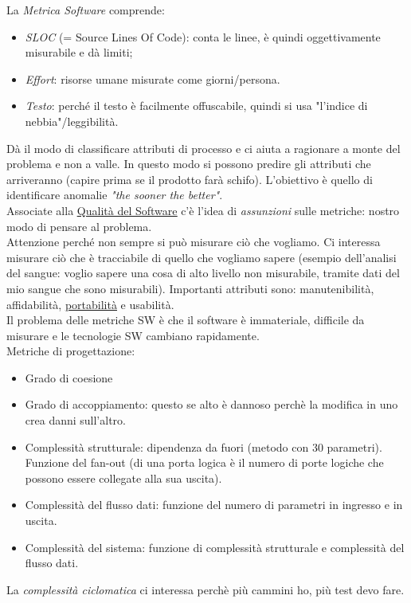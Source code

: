 		La \textit{Metrica Software} comprende:
			\begin{itemize}
				\item \textit{SLOC} (= Source Lines Of Code): conta le linee, è quindi oggettivamente misurabile e dà limiti;
				\item \textit{Effort}: risorse umane misurate come giorni/persona.
				\item \textit{Testo}: perché il testo è facilmente offuscabile, quindi si usa "l'indice di nebbia"/leggibilità. 
			\end{itemize}
		Dà il modo di classificare attributi di processo e ci aiuta a ragionare a monte del problema e non a valle. In questo modo si possono predire gli attributi che arriveranno (capire prima se il prodotto farà schifo). L'obiettivo è quello di identificare anomalie \textit{"the sooner the better"}. \\
		Associate alla \underline{\hyperref[qualita]{Qualità del Software}} c'è l'idea di \textit{assunzioni} sulle metriche: nostro modo di pensare al problema. \\
		Attenzione perché non sempre si può misurare ciò che vogliamo. Ci interessa misurare ciò che è tracciabile di quello che vogliamo sapere (esempio dell'analisi del sangue: voglio sapere una cosa di alto livello non misurabile, tramite dati del mio sangue che sono misurabili). Importanti attributi sono: manutenibilità, affidabilità, \underline{\hyperref[portabilita]{portabilità}} e usabilità.\\
		Il problema delle metriche SW è che il software è immateriale, difficile da misurare e le tecnologie SW cambiano rapidamente. \\
		Metriche di progettazione:
		\begin{itemize}
			\item Grado di coesione
			\item Grado di accoppiamento: questo se alto è dannoso perchè la modifica in uno crea danni sull'altro.
			\item Complessità strutturale: dipendenza da fuori (metodo con 30 parametri). Funzione del fan-out (di una porta logica è il numero di porte logiche che possono essere collegate alla sua uscita).
			\item Complessità del flusso dati: funzione del numero di parametri in ingresso e in uscita.
			\item Complessità del sistema: funzione di complessità strutturale e complessità del flusso dati.
		\end{itemize}
		La \textit{complessità ciclomatica} ci interessa perchè più cammini ho, più test devo fare.
		

